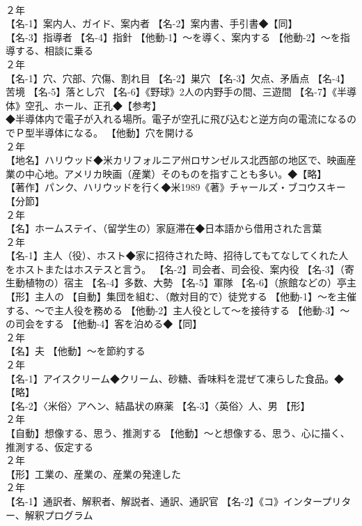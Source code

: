 \documentclass[8pt]{extreport}
\begin{document}
\begin{CJK}{UTF8}{min}
\\	２年	
\\	【名-1】案内人、ガイド、案内者 【名-2】案内書、手引書◆【同】
\\	【名-3】指導者 【名-4】指針 【他動-1】～を導く、案内する 【他動-2】～を指導する、相談に乗る
\\	２年	
\\	【名-1】穴、穴部、穴傷、割れ目 【名-2】巣穴 【名-3】欠点、矛盾点 【名-4】苦境 【名-5】落とし穴 【名-6】《野球》2人の内野手の間、三遊間 【名-7】《半導体》空孔、ホール、正孔◆【参考】
\\	◆半導体内で電子が入れる場所。電子が空孔に飛び込むと逆方向の電流になるのでＰ型半導体になる。 【他動】穴を開ける
\\	２年	
\\	【地名】ハリウッド◆米カリフォルニア州ロサンゼルス北西部の地区で、映画産業の中心地。アメリカ映画（産業）そのものを指すことも多い。◆【略】
\\	【著作】パンク、ハリウッドを行く◆米1989《著》チャールズ・ブコウスキー
\\	【分節】
\\	２年	
\\	【名】ホームステイ、（留学生の）家庭滞在◆日本語から借用された言葉
\\	２年	
\\	【名-1】主人（役）、ホスト◆家に招待された時、招待してもてなしてくれた人をホストまたはホステスと言う。 【名-2】司会者、司会役、案内役 【名-3】（寄生動植物の）宿主 【名-4】多数、大勢 【名-5】軍隊 【名-6】（旅館などの）亭主 【形】主人の 【自動】集団を組む、（敵対目的で）徒党する 【他動-1】～を主催する、～で主人役を務める 【他動-2】主人役として～を接待する 【他動-3】～の司会をする 【他動-4】客を泊める◆【同】
\\	２年	
\\	【名】夫 【他動】～を節約する
\\	２年	
\\	【名-1】アイスクリーム◆クリーム、砂糖、香味料を混ぜて凍らした食品。◆【略】
\\	【名-2】〈米俗〉アヘン、結晶状の麻薬 【名-3】〈英俗〉人、男 【形】
\\	２年	
\\	【自動】想像する、思う、推測する 【他動】～と想像する、思う、心に描く、推測する、仮定する
\\	２年	
\\	【形】工業の、産業の、産業の発達した
\\	２年	
\\	【名-1】通訳者、解釈者、解説者、通訳、通訳官 【名-2】《コ》インタープリター、解釈プログラム

\end{CJK}
\end{document}
